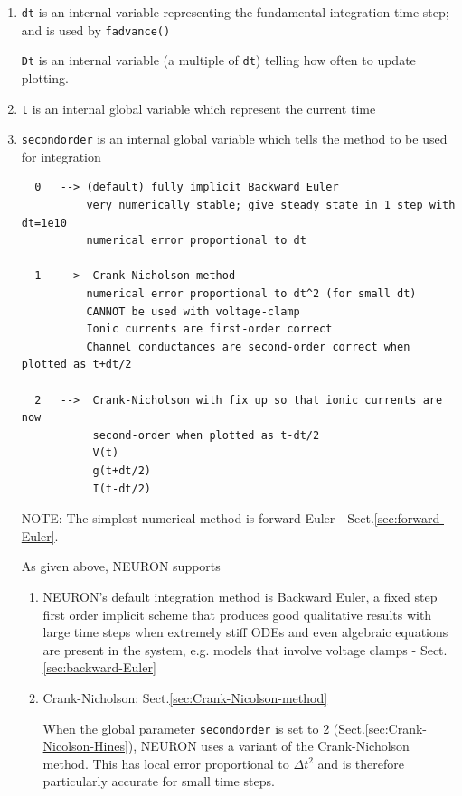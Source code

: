 \begin{enumerate}
  \item \verb!dt! is an internal variable representing the fundamental
  integration time step; and is used by \verb!fadvance()!

\verb!Dt! is an internal variable (a multiple of \verb!dt!)  
telling how often to update plotting.

  \item \verb!t! is an internal global variable which represent the current time
  
  \item  \verb!secondorder! is an internal global variable which tells the
  method to be used for integration
  \begin{verbatim}
  0   --> (default) fully implicit Backward Euler 
          very numerically stable; give steady state in 1 step with dt=1e10
          numerical error proportional to dt
          
  1   -->  Crank-Nicholson method 
          numerical error proportional to dt^2 (for small dt)
          CANNOT be used with voltage-clamp
          Ionic currents are first-order correct
          Channel conductances are second-order correct when plotted as t+dt/2
          
  2   -->  Crank-Nicholson with fix up so that ionic currents are now
           second-order when plotted as t-dt/2
           V(t)
           g(t+dt/2)
           I(t-dt/2)
  \end{verbatim}

NOTE: The simplest numerical method is forward Euler -
Sect.\ref{sec:forward-Euler}.

As given above, NEURON supports
\begin{enumerate}
  
  \item NEURON's default integration method is Backward Euler, a fixed step
  first order implicit scheme that produces good qualitative results with large
  time steps when extremely stiff ODEs and even algebraic equations are present
  in the system, e.g. models that involve voltage clamps -
  Sect.\ref{sec:backward-Euler}

  \item Crank-Nicholson: Sect.\ref{sec:Crank-Nicolson-method}
  
When the global parameter \verb!secondorder! is set to 2
(Sect.\ref{sec:Crank-Nicolson-Hines}), NEURON uses a variant of the
Crank-Nicholson method. This has local error proportional to $\Delta t^2$ and is
therefore particularly accurate for small time steps.


\end{enumerate}
\end{enumerate}
